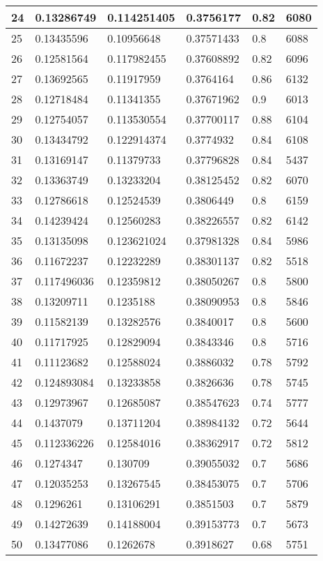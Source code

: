 \begin{longtable}{|l|l|l|l|l|l|}
24 & 0.13286749 & 0.114251405 & 0.3756177 & 0.82 & 6080 \\ \hline 
25 & 0.13435596 & 0.10956648 & 0.37571433 & 0.8 & 6088 \\ \hline 
26 & 0.12581564 & 0.117982455 & 0.37608892 & 0.82 & 6096 \\ \hline 
27 & 0.13692565 & 0.11917959 & 0.3764164 & 0.86 & 6132 \\ \hline 
28 & 0.12718484 & 0.11341355 & 0.37671962 & 0.9 & 6013 \\ \hline 
29 & 0.12754057 & 0.113530554 & 0.37700117 & 0.88 & 6104 \\ \hline 
30 & 0.13434792 & 0.122914374 & 0.3774932 & 0.84 & 6108 \\ \hline 
31 & 0.13169147 & 0.11379733 & 0.37796828 & 0.84 & 5437 \\ \hline 
32 & 0.13363749 & 0.13233204 & 0.38125452 & 0.82 & 6070 \\ \hline 
33 & 0.12786618 & 0.12524539 & 0.3806449 & 0.8 & 6159 \\ \hline 
34 & 0.14239424 & 0.12560283 & 0.38226557 & 0.82 & 6142 \\ \hline 
35 & 0.13135098 & 0.123621024 & 0.37981328 & 0.84 & 5986 \\ \hline 
36 & 0.11672237 & 0.12232289 & 0.38301137 & 0.82 & 5518 \\ \hline 
37 & 0.117496036 & 0.12359812 & 0.38050267 & 0.8 & 5800 \\ \hline 
38 & 0.13209711 & 0.1235188 & 0.38090953 & 0.8 & 5846 \\ \hline 
39 & 0.11582139 & 0.13282576 & 0.3840017 & 0.8 & 5600 \\ \hline 
40 & 0.11717925 & 0.12829094 & 0.3843346 & 0.8 & 5716 \\ \hline 
41 & 0.11123682 & 0.12588024 & 0.3886032 & 0.78 & 5792 \\ \hline 
42 & 0.124893084 & 0.13233858 & 0.3826636 & 0.78 & 5745 \\ \hline 
43 & 0.12973967 & 0.12685087 & 0.38547623 & 0.74 & 5777 \\ \hline 
44 & 0.1437079 & 0.13711204 & 0.38984132 & 0.72 & 5644 \\ \hline 
45 & 0.112336226 & 0.12584016 & 0.38362917 & 0.72 & 5812 \\ \hline 
46 & 0.1274347 & 0.130709 & 0.39055032 & 0.7 & 5686 \\ \hline 
47 & 0.12035253 & 0.13267545 & 0.38453075 & 0.7 & 5706 \\ \hline 
48 & 0.1296261 & 0.13106291 & 0.3851503 & 0.7 & 5879 \\ \hline 
49 & 0.14272639 & 0.14188004 & 0.39153773 & 0.7 & 5673 \\ \hline 
50 & 0.13477086 & 0.1262678 & 0.3918627 & 0.68 & 5751 \\ \hline 
\end{longtable}